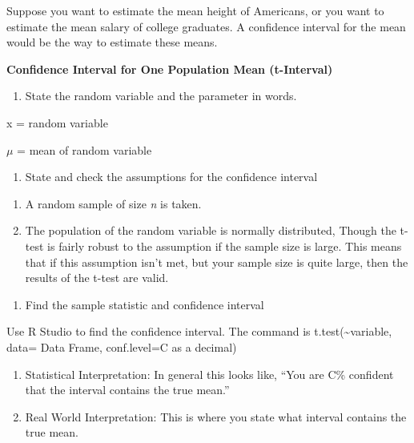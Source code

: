 \documentclass[]{book}
\providecommand{\tightlist}{%
  \setlength{\itemsep}{0pt}\setlength{\parskip}{0pt}}
\begin{document}
Suppose you want to estimate the mean height of Americans, or you want to estimate the mean salary of college graduates. A confidence interval for the mean would be the way to estimate these means.

\textbf{Confidence Interval for One Population Mean (t-Interval)}

\begin{enumerate}
\def\labelenumi{\arabic{enumi}.}
\tightlist
\item
  State the random variable and the parameter in words.
\end{enumerate}

x = random variable

\(\mu\) = mean of random variable

\begin{enumerate}
\def\labelenumi{\arabic{enumi}.}
\setcounter{enumi}{1}
\tightlist
\item
  State and check the assumptions for the confidence interval
\end{enumerate}

\begin{enumerate}
\def\labelenumi{\alph{enumi}.}
\item
  A random sample of size \emph{n} is taken.
\item
  The population of the random variable is normally distributed, Though the t-test is fairly robust to the assumption if the sample size is large. This means that if this assumption isn't met, but your sample size is quite large, then the results of the t-test are valid.
\end{enumerate}

\begin{enumerate}
\def\labelenumi{\arabic{enumi}.}
\setcounter{enumi}{2}
\tightlist
\item
  Find the sample statistic and confidence interval
\end{enumerate}

Use R Studio to find the confidence interval. The command is t.test(\textasciitilde{}variable, data= Data Frame, conf.level=C as a decimal)

\begin{enumerate}
\def\labelenumi{\arabic{enumi}.}
\setcounter{enumi}{3}
\item
  Statistical Interpretation: In general this looks like, ``You are C\% confident that the interval contains the true mean.''
\item
  Real World Interpretation: This is where you state what interval contains the true mean.
\end{enumerate}
\end{document}
